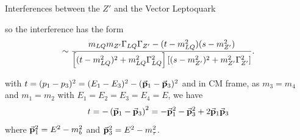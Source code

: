 \documentclass{../bredelebeamer}
\begin{document}
\begin{frame}{Interferences between the $Z'$ and the Vector Leptoquark}
\begin{minipage}{.53\linewidth}
\begin{equation*}
        \end{equation*}
        so the interference has the form
        \begin{equation}\notag
            \sim \frac{ m_{LQ}m_{Z'}\Gamma_{LQ}\Gamma_{Z'}- (t-m_{LQ}^2)(s-m_{Z'}^2)}{\left[
                (t-m_{LQ}^2)^2 + m_{LQ}^2\Gamma_{LQ}^2
            \right]
            \left[
                (s-m_{Z'}^2)^2 + m_{Z'}^2\Gamma_{Z'}^2
            \right]}.
        \end{equation}
	\end{minipage}
    with $t = (p_1 - p_3)^2 = (E_1 - E_3)^2 - (\va p_1 - \va p_3)^2$ and in CM frame, as $m_3=m_4$ and $m_1=m_2$ with $E_1=E_2=E_3=E_4=E$, we have
    \begin{equation}
        t = -\left(\va p_1 - \va p_3\right)^2 = - \va p_1^2 - \va p_3^2 + 2\va p_1\va p_3 
    \end{equation}
    where $\va p_1^2 = E^2 - m_b^2 $  and $\va p_3^2 = E^2 - m_\tau^2 $.
\end{frame}
\end{document}
